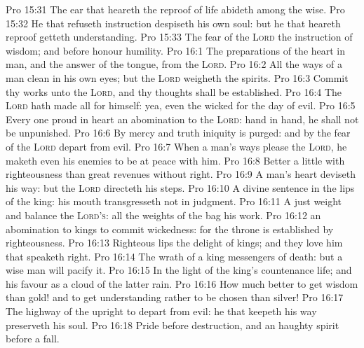 \vs Pro 15:31 The ear that heareth the reproof of life abideth among the wise.
\vs Pro 15:32 He that refuseth instruction despiseth his own soul: but he that heareth reproof getteth understanding.
\vs Pro 15:33 The fear of the \textsc{Lord}  the instruction of wisdom; and before honour  humility.
\vs Pro 16:1 The preparations of the heart in man, and the answer of the tongue,  from the \textsc{Lord}.
\vs Pro 16:2 All the ways of a man  clean in his own eyes; but the \textsc{Lord} weigheth the spirits.
\vs Pro 16:3 Commit thy works unto the \textsc{Lord}, and thy thoughts shall be established.
\vs Pro 16:4 The \textsc{Lord} hath made all  for himself: yea, even the wicked for the day of evil.
\vs Pro 16:5 Every one  proud in heart  an abomination to the \textsc{Lord}:  hand  in hand, he shall not be unpunished.
\vs Pro 16:6 By mercy and truth iniquity is purged: and by the fear of the \textsc{Lord}  depart from evil.
\vs Pro 16:7 When a man's ways please the \textsc{Lord}, he maketh even his enemies to be at peace with him.
\vs Pro 16:8 Better  a little with righteousness than great revenues without right.
\vs Pro 16:9 A man's heart deviseth his way: but the \textsc{Lord} directeth his steps.
\vs Pro 16:10 A divine sentence  in the lips of the king: his mouth transgresseth not in judgment.
\vs Pro 16:11 A just weight and balance  the \textsc{Lord's}: all the weights of the bag  his work.
\vs Pro 16:12  an abomination to kings to commit wickedness: for the throne is established by righteousness.
\vs Pro 16:13 Righteous lips  the delight of kings; and they love him that speaketh right.
\vs Pro 16:14 The wrath of a king  messengers of death: but a wise man will pacify it.
\vs Pro 16:15 In the light of the king's countenance  life; and his favour  as a cloud of the latter rain.
\vs Pro 16:16 How much better  to get wisdom than gold! and to get understanding rather to be chosen than silver!
\vs Pro 16:17 The highway of the upright  to depart from evil: he that keepeth his way preserveth his soul.
\vs Pro 16:18 Pride  before destruction, and an haughty spirit before a fall.
